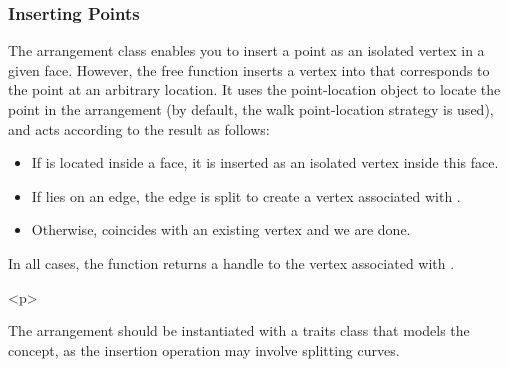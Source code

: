 \subsubsection{Inserting Points}
\label{arr_sssec:insert_point}
%
The arrangement class enables you to insert a point as an isolated
vertex in a given face. However, the free function
 inserts a vertex into  that
corresponds to the point  at an arbitrary location. It uses
the point-location object  to locate the point in the
arrangement (by default, the walk point-location strategy is used),
and acts according to the result as follows:
\begin{itemize}
\item If  is located inside a face, it is inserted as an
isolated vertex inside this face.
\item If  lies on an edge, the edge is split to create a
vertex associated with .
\item Otherwise,  coincides with an existing vertex and
we are done.
\end{itemize}
In all cases, the function returns a handle to the vertex
associated with .

\begin{ccHtmlOnly}<p>\end{ccHtmlOnly}
The arrangement  should be instantiated with a traits class
that models the  concept, as the
insertion operation may involve splitting curves.

